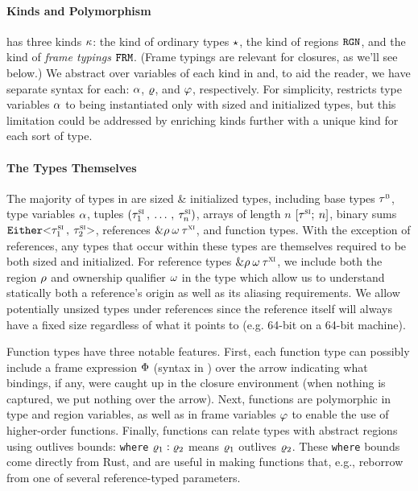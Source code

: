 \paragraph{Kinds and Polymorphism} \lang has three kinds $\kappa$: the kind of
ordinary types $\star$, the kind of regions $\texttt{RGN}$, and the kind of
\emph{frame typings} $\texttt{FRM}$. (Frame typings are relevant for closures, as
we'll see below.) We abstract over variables of each kind in \lang and, to aid
the reader, we have separate syntax for each: $\alpha$, $\varrho$, and
$\varphi$, respectively. For simplicity, \lang restricts type variables
$\alpha$ to being instantiated only with sized and initialized types, but this
limitation could be addressed by enriching kinds further with a unique kind for
each sort of type.

\paragraph{The Types Themselves} The majority of types in \lang are sized \&
initialized types, including base types $\tau^\textsc{b}$, type variables $\alpha$,
tuples $(\tau^\textsc{si}_1 \, , \: \ldots \, , \: \tau^\textsc{si}_n)$, arrays of length $n$
$[\tau^\textsc{si} ; \: n]$, binary sums $\mathtt{Either} \mathtt{<} \tau^\textsc{si}_1 \, , \: \tau^\textsc{si}_2 \mathtt{>}$,
references $\& \rho \: \omega \: \tau^\textsc{xi}$, and function types.
With the exception of references, any types that occur within these types are
themselves required to be both sized and initialized. For reference types
$\& \rho \: \omega \: \tau^\textsc{xi}$, we include both the region $\rho$ and
ownership qualifier $\omega$ in the type which allow us to understand
statically both a reference's origin as well as its aliasing requirements. We
allow potentially unsized types under references since the reference itself will
always have a fixed size regardless of what it points to (e.g. 64-bit on a
64-bit machine).

Function types have three notable features. First, each function type can
possibly include a frame expression $\Phi$ (syntax in ) over the
arrow indicating what bindings, if any, were caught up in the closure
environment (when nothing is captured, we put nothing over the arrow). Next,
functions are polymorphic in type and region variables, as well as in frame
variables $\varphi$ to enable the use of higher-order functions. Finally,
functions can relate types with abstract regions using outlives bounds:
\texttt{where} $\varrho_1: \varrho_2$ means $\varrho_1$ outlives
$\varrho_2$. These \texttt{where} bounds come directly from Rust, and are
useful in making functions that, e.g., reborrow from one of several
reference-typed parameters.

